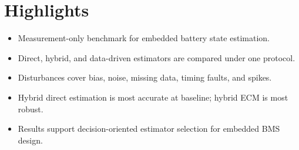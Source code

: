 \documentclass[12pt]{article}
\begin{document}
\section*{Highlights}
\begin{itemize}
    \item Measurement-only benchmark for embedded battery state estimation.
    \item Direct, hybrid, and data-driven estimators are compared under one protocol.
    \item Disturbances cover bias, noise, missing data, timing faults, and spikes.
    \item Hybrid direct estimation is most accurate at baseline; hybrid ECM is most robust.
    \item Results support decision-oriented estimator selection for embedded BMS design.
\end{itemize}
\end{document}
